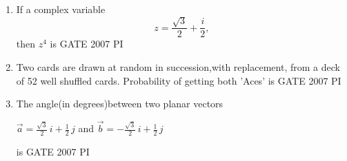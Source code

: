 \documentclass[journal,12pt,onecolumn]{IEEEtran}
\theoremstyle{remark}
\begin{document}
\begin{enumerate}
    



\item
If a complex variable 
\[
z = \frac{\sqrt{3}}{2} + \frac{i}{2},
\]
then \( z^4 \) is
\hfill{GATE 2007 PI}
\begin{enumerate}
\end{enumerate}



    
    
    
  \item 
    Two cards are drawn at random in succession,with replacement, from a deck of 52 well shuffled cards. Probability of getting both 'Aces' is
    \hfill{GATE 2007 PI}
    \begin{enumerate}
    \end{enumerate}
    
    \item 
    The angle(in degrees)between two planar vectors 
    
$\vec{a} = \frac{\sqrt{3}}{2} \, i + \frac{1}{2} \, j$
and $\vec{b} = -\frac{\sqrt{3}}{2} \, i + \frac{1}{2} \, j$

      is
      \hfill{GATE 2007 PI}
      \begin{enumerate}
      \end{enumerate}
      

\end{enumerate}
\end{document}
